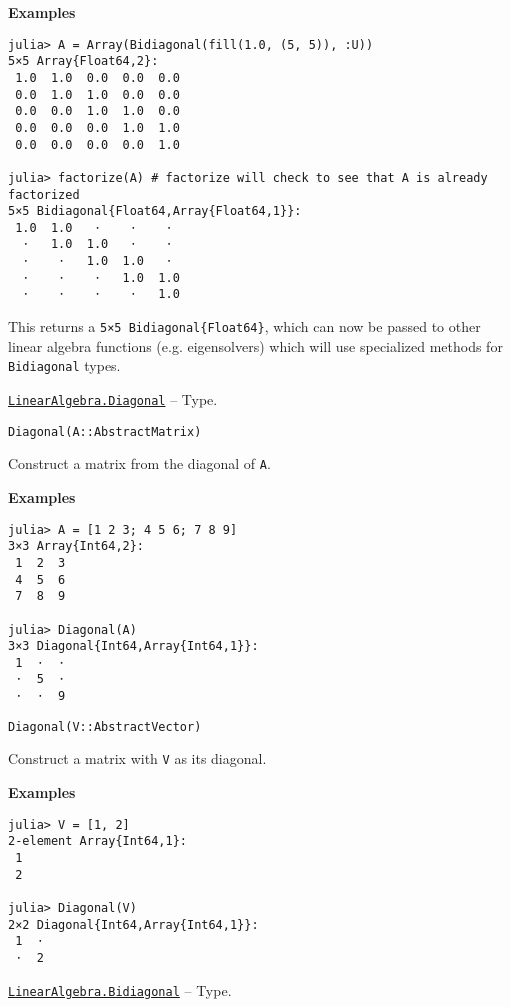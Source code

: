 \begin{adjustwidth}{2em}{0pt}
\textbf{Examples}


\begin{verbatim}
julia> A = Array(Bidiagonal(fill(1.0, (5, 5)), :U))
5×5 Array{Float64,2}:
 1.0  1.0  0.0  0.0  0.0
 0.0  1.0  1.0  0.0  0.0
 0.0  0.0  1.0  1.0  0.0
 0.0  0.0  0.0  1.0  1.0
 0.0  0.0  0.0  0.0  1.0

julia> factorize(A) # factorize will check to see that A is already factorized
5×5 Bidiagonal{Float64,Array{Float64,1}}:
 1.0  1.0   ⋅    ⋅    ⋅
  ⋅   1.0  1.0   ⋅    ⋅
  ⋅    ⋅   1.0  1.0   ⋅
  ⋅    ⋅    ⋅   1.0  1.0
  ⋅    ⋅    ⋅    ⋅   1.0
\end{verbatim}

This returns a \texttt{5×5 Bidiagonal\{Float64\}}, which can now be passed to other linear algebra functions (e.g. eigensolvers) which will use specialized methods for \texttt{Bidiagonal} types.



\end{adjustwidth}
\hypertarget{3300114559258360989}{} 
\hyperlink{3300114559258360989}{\texttt{LinearAlgebra.Diagonal}}  -- {Type.}

\begin{adjustwidth}{2em}{0pt}


\begin{verbatim}
Diagonal(A::AbstractMatrix)
\end{verbatim}

Construct a matrix from the diagonal of \texttt{A}.

\textbf{Examples}


\begin{verbatim}
julia> A = [1 2 3; 4 5 6; 7 8 9]
3×3 Array{Int64,2}:
 1  2  3
 4  5  6
 7  8  9

julia> Diagonal(A)
3×3 Diagonal{Int64,Array{Int64,1}}:
 1  ⋅  ⋅
 ⋅  5  ⋅
 ⋅  ⋅  9
\end{verbatim}




\begin{lstlisting}
Diagonal(V::AbstractVector)
\end{lstlisting}

Construct a matrix with \texttt{V} as its diagonal.

\textbf{Examples}


\begin{verbatim}
julia> V = [1, 2]
2-element Array{Int64,1}:
 1
 2

julia> Diagonal(V)
2×2 Diagonal{Int64,Array{Int64,1}}:
 1  ⋅
 ⋅  2
\end{verbatim}



\end{adjustwidth}
\hypertarget{6156150905679680892}{} 
\hyperlink{6156150905679680892}{\texttt{LinearAlgebra.Bidiagonal}}  -- {Type.}

